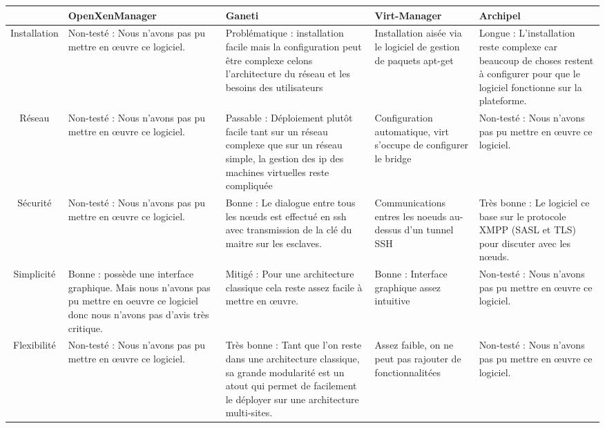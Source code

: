 \begin{center}
\begin{tabular}{|c|M{2.7cm}|M{2.7cm}|M{2.7cm}|M{2.7cm}|}
\hline
 & OpenXenManager & Ganeti & Virt-Manager & Archipel \tabularnewline
\hline
Installation & Non-testé : Nous n’avons pas pu mettre en œuvre ce logiciel. & Problématique : installation facile mais la configuration peut être complexe celons l'architecture du réseau et les besoins des utilisateurs & Installation aisée via le logiciel de gestion de paquets apt-get& Longue : L’installation reste complexe car beaucoup de choses restent à configurer pour que le logiciel fonctionne sur la plateforme.\tabularnewline
\hline
Réseau & Non-testé : Nous n’avons pas pu mettre en œuvre ce logiciel. & Passable : Déploiement plutôt facile tant sur un réseau complexe que sur un réseau simple, la gestion des ip des machines virtuelles reste compliquée & Configuration automatique, virt s'occupe de configurer le bridge & Non-testé : Nous n’avons pas pu mettre en œuvre ce logiciel.\tabularnewline
\hline
Sécurité & Non-testé : Nous n’avons pas pu mettre en œuvre ce logiciel. & Bonne : Le dialogue entre tous les nœuds est effectué en ssh avec transmission de la clé du maitre sur les esclaves. & Communications entres les noeuds au-dessus d'un tunnel SSH & Très bonne : Le logiciel ce base sur le protocole XMPP (SASL et TLS) pour discuter avec les nœuds.\tabularnewline
\hline
Simplicité & Bonne : possède une interface graphique. Mais nous n'avons pas pu mettre en oeuvre ce logiciel donc nous n'avons pas d'avis très critique. & Mitigé : Pour une architecture classique cela reste assez facile à mettre en œuvre. & Bonne : Interface graphique assez intuitive & Non-testé : Nous n’avons pas pu mettre en œuvre ce logiciel. \tabularnewline
\hline
Flexibilité & Non-testé : Nous n’avons pas pu mettre en œuvre ce logiciel. & Très bonne : Tant que l'on reste dans une architecture classique, sa grande modularité est un atout qui permet de facilement le déployer sur une architecture multi-sites. & Assez faible, on ne peut pas rajouter de fonctionnalitées& Non-testé : Nous n’avons pas pu mettre en œuvre ce logiciel. \tabularnewline
\hline
\end{tabular}
\end{center}
